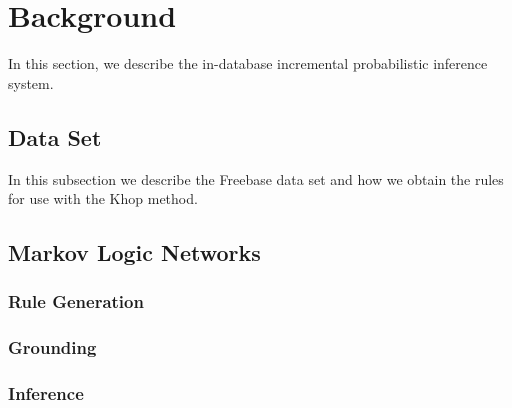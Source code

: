 
\section{Background}

In this section, we describe the in-database incremental probabilistic inference system.

\subsection{Data Set}
In this subsection we describe the Freebase data set and how we obtain the rules for use with the Khop method.

\subsection{Markov Logic Networks}

\subsubsection{Rule Generation}


\subsubsection{Grounding}

\cite{chen2014knowledge}


\subsubsection{Inference}




